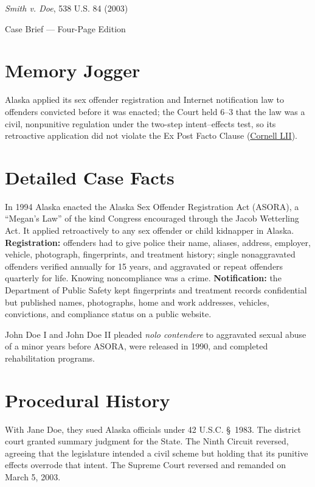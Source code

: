 \documentclass[12pt]{article}
\begin{document}
\begin{center}
{\LARGE \textit{Smith v. Doe}, 538 U.S. 84 (2003)\par}
\vspace{0.8em}
{\large Case Brief --- Four-Page Edition\par}
\end{center}
\vspace{1em}

\section{Memory Jogger}

Alaska applied its sex offender registration and Internet notification law to offenders convicted before it was enacted; the Court held 6--3 that the law was a civil, nonpunitive regulation under the two-step intent--effects test, so its retroactive application did not violate the Ex Post Facto Clause (\href{https://www.law.cornell.edu/supct/html/01-729.ZO.html}{Cornell LII}).

\section{Detailed Case Facts}

In 1994 Alaska enacted the Alaska Sex Offender Registration Act (ASORA), a ``Megan's Law'' of the kind Congress encouraged through the Jacob Wetterling Act. It applied retroactively to any sex offender or child kidnapper in Alaska. \textbf{Registration:} offenders had to give police their name, aliases, address, employer, vehicle, photograph, fingerprints, and treatment history; single nonaggravated offenders verified annually for 15 years, and aggravated or repeat offenders quarterly for life. Knowing noncompliance was a crime. \textbf{Notification:} the Department of Public Safety kept fingerprints and treatment records confidential but published names, photographs, home and work addresses, vehicles, convictions, and compliance status on a public website.

John Doe I and John Doe II pleaded \textit{nolo contendere} to aggravated sexual abuse of a minor years before ASORA, were released in 1990, and completed rehabilitation programs.

\section{Procedural History}

With Jane Doe, they sued Alaska officials under 42 U.S.C. \S~1983. The district court granted summary judgment for the State. The Ninth Circuit reversed, agreeing that the legislature intended a civil scheme but holding that its punitive effects overrode that intent. The Supreme Court reversed and remanded on March 5, 2003.
\end{document}
